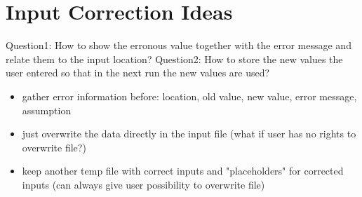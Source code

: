 \documentclass[11pt]{article}
\begin{document}
\section{Input Correction Ideas}

Question1: How to show the erronous value together with the error message and relate them to the input location?
Question2: How to store the new values the user entered so that in the next run the new values are used?

\begin{itemize}
  \item gather error information before: location, old value, new value, error message, assumption
  \item just overwrite the data directly in the input file (what if user has no rights to overwrite file?)
  \item keep another temp file with correct inputs and "placeholders" for corrected inputs (can always give user possibility to overwrite file)
\end{itemize}
\end{document}
